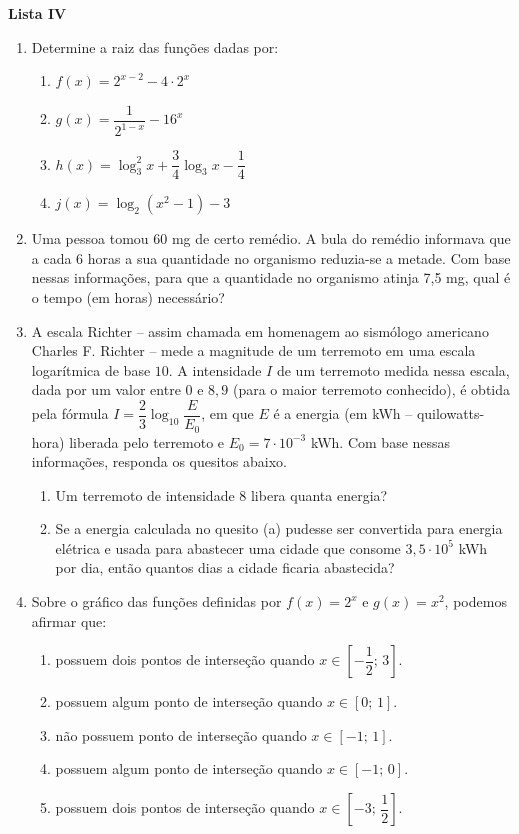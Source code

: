 \documentclass[12pt,a4paper]{article}
\begin{document}
\begin{center}
  \textbf{Lista IV}
\end{center}

\begin{enumerate}
  \item Determine a raiz das funções dadas por:
    \begin{enumerate}
      \item $f(x) = 2^{x - 2} - 4\cdot 2^x$
      \item $g(x) = \dfrac{1}{2^{1-x}} - 16^x$
      \item $h(x) = \log^2_3 x + \dfrac{3}{4}\log_3 x - \dfrac{1}{4}$
      \item $j(x) = \log_2 (x^2 - 1) - 3$
    \end{enumerate}     

  \item Uma pessoa tomou 60 mg de certo remédio. A bula do remédio informava que
    a cada 6 horas a sua quantidade no organismo reduzia-se a metade. Com base
    nessas informações, para que a quantidade no organismo atinja 7,5 mg, qual
    é o tempo (em horas) necessário?

  \item A escala Richter -- assim chamada em homenagem ao sismólogo americano
  Charles F. Richter -- mede a magnitude de um terremoto em uma escala logarítmica
  de base $10$. A intensidade $I$ de um terremoto medida nessa escala, dada por um
  valor entre $0$ e $8,9$ (para o maior terremoto conhecido), é obtida pela
  fórmula $I=\dfrac{2}{3}\log_{10}\dfrac{E}{E_{0}}$, em que $E$ é a energia
  (em kWh -- quilowatts-hora) liberada pelo terremoto e $E_{0}=7\cdot10^{-3}$ kWh.
  Com base nessas informações, responda os quesitos abaixo.
    \begin{enumerate}
      \item Um terremoto de intensidade $8$ libera quanta energia?
      \item Se a energia calculada no quesito (a) pudesse ser convertida para
        energia elétrica e usada para abastecer uma cidade que consome $3,5\cdot10^{5}$
        kWh por dia, então quantos dias a cidade ficaria abastecida?
    \end{enumerate}
 
  \item Sobre o gráfico das funções definidas por $f(x)=2^x$ e $g(x) = x^2$, podemos afirmar que:
    \begin{enumerate}
      \item possuem dois pontos de interseção quando $x\in\left[-\dfrac{1}{2};\,3\right]$.
      \item possuem algum ponto de interseção quando $x\in[0;\,1]$.
      \item não possuem ponto de interseção quando $x\in[-1;\,1]$.
      \item possuem algum ponto de interseção quando $x\in[-1;\,0]$. %
      \item possuem dois pontos de interseção quando $x\in\left[-3;\,\dfrac{1}{2}\right]$.
    \end{enumerate}


\end{enumerate}
\end{document}
